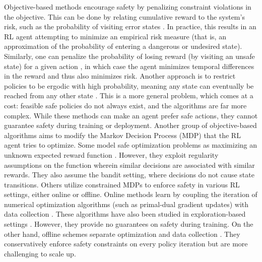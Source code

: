 Objective-based methods encourage safety by penalizing constraint violations in the objective.
This can be done by relating cumulative reward to the system's risk, such as the probability of visiting error states \cite{geibel2005risk}.
In practice, this results in an RL agent attempting to minimize an empirical risk measure (that is, an approximation of the probability of entering a dangerous or undesired state).
Similarly, one can penalize the probability of losing reward (by visiting an unsafe state) for a given action \cite{mihatsch2002risk}, in which case the agent minimizes temporal differences in the reward and thus also minimizes risk.
Another approach is to restrict policies to be ergodic with high probability, meaning any state can eventually be reached from any other state \cite{moldovan2012safe}.
This is a more general problem, which comes at a cost: feasible safe policies do not always exist, and the algorithms are far more complex. 
While these methods can make an agent prefer safe actions, they cannot guarantee safety during training or deployment.
Another group of objective-based algorithms aims to modify the Markov Decision Process (MDP) that the RL agent tries to optimize.
Some model safe optimization problems as maximizing an unknown expected reward function \cite{pmlr-v37-sui15}.
However, they exploit regularity assumptions on the function wherein similar decisions are associated with similar rewards.
They also assume the bandit setting, where decisions do not cause state transitions.
Others utilize constrained MDPs \cite{altman1999constrained} to enforce safety in various RL settings, either online or offline.
Online methods learn by coupling the iteration of numerical optimization algorithms (such as primal-dual gradient updates) with data collection \cite{BORKAR2005207,chow2017riskconstrained,tessler2018reward,bohez2019value}.
These algorithms have also been studied in exploration-based settings \cite{ding2020provably,efroni2020explorationexploitation}.
However, they provide no guarantees on safety during training.
On the other hand, offline schemes separate optimization and data collection \cite{achiam2017constrained,bharadhwaj2021conservative}.
They conservatively enforce safety constraints on every policy iteration but are more challenging to scale up.


